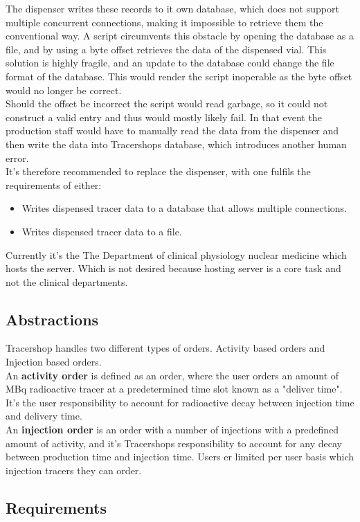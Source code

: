 \documentclass{article}
\begin{document}
The dispenser writes these records to it own database, which does not support multiple concurrent connections, making it impossible to retrieve them the conventional way.
A script circumvents this obstacle by opening the database as a file, and by using a byte offset retrieves the data of the dispensed vial.
This solution is highly fragile, and an update to the database could change the file format of the database.
This would render the script inoperable as the byte offset would no longer be correct.\\
Should the offset be incorrect the script would read garbage, so it could not construct a valid entry and thus would mostly likely fail.
In that event the production staff would have to manually read the data from the dispenser and then write the data into Tracershops database, which introduces another human error.\\
It's therefore recommended to replace the dispenser, with one fulfils the requirements of either:
\begin{itemize}
  \item Writes dispensed tracer data to a database that allows multiple connections.
  \item Writes dispensed tracer data to a file.
\end{itemize}
Currently it's the The Department of clinical physiology nuclear medicine which hosts the server.
Which is not desired because hosting server is a core task  and not the clinical departments.

\subsection*{Abstractions}
Tracershop handles two different types of orders. Activity based orders and Injection based orders.\\
An \textbf{activity order} is defined as an order, where the user orders an amount of MBq radioactive tracer at a predetermined time slot known as a "deliver time".
It's the user responsibility to account for radioactive decay between injection time and delivery time.\\
An \textbf{injection order} is an order with a number of injections with a predefined amount of activity, and it's Tracershops responsibility to account for any decay between production time and injection time.
Users er limited per user basis which injection tracers they can order.

\subsection*{Requirements}
\end{document}
